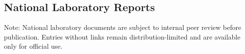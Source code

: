 \documentclass{article}[12pt]
\begin{document}
	
	
	\subsection*{National Laboratory Reports}
	
	Note: National laboratory documents are subject to internal peer review before publication. Entries without links remain distribution-limited and are available only for official use.
	
\end{document}
